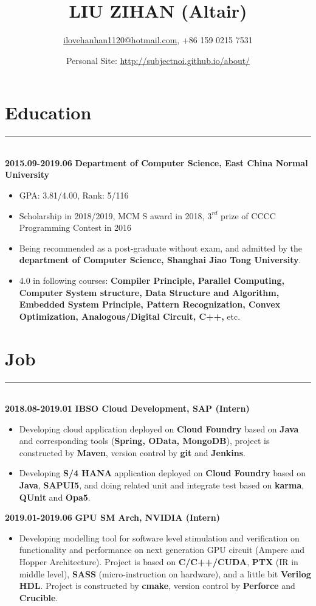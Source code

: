 \documentclass[a4paper]{article}
\title{LIU ZIHAN (Altair)}
\author{\url{ilovehanhan1120@hotmail.com}, +86 159 0215 7531}
\date{Personal Site: \url{http://subjectnoi.github.io/about/}}
\begin{document}
		\maketitle
		\section*{Education}
		\rule[1pt]{19cm}{0.01em}\\
		\textbf{2015.09-2019.06} \hfill \textbf{Department of Computer Science, East China Normal University}
		\begin{itemize}
		\item GPA: 3.81/4.00, Rank: 5/116
		\item Scholarship in 2018/2019, MCM S award in 2018, $ 3^{rd} $ prize of CCCC Programming Contest in 2016
		\item Being recommended as a post-graduate without exam, and admitted by the \textbf{department of Computer Science, Shanghai Jiao Tong University}.
		\item 4.0 in following courses: \textbf{Compiler Principle, Parallel Computing, Computer System structure, Data Structure and Algorithm, Embedded System Principle, Pattern Recognization, Convex Optimization, Analogous/Digital Circuit, C++,} etc.
		\end{itemize}
		\section*{Job}
		\rule[1pt]{19cm}{0.01em}\\
		\textbf{2018.08-2019.01} \hfill \textbf{IBSO Cloud Development, SAP (Intern)}\\
		\begin{itemize}
		\item Developing cloud application deployed on \textbf{Cloud Foundry} based on \textbf{Java} and corresponding tools (\textbf{Spring, OData, MongoDB}), project is constructed by \textbf{Maven}, version control by \textbf{git} and \textbf{Jenkins}.
		\item Developing \textbf{S/4 HANA} application deployed on \textbf{Cloud Foundry} based on \textbf{Java}, \textbf{SAPUI5}, and doing related unit and integrate test based on \textbf{karma}, \textbf{QUnit} and \textbf{Opa5}.
		\end{itemize}
		\textbf{2019.01-2019.06} \hfill \textbf{GPU SM Arch, NVIDIA (Intern)}
		\begin{itemize}
		\item Developing modelling tool for software level stimulation and verification on functionality and performance on next generation GPU circuit (Ampere and Hopper Architecture). Project is based on \textbf{C/C++/CUDA}, \textbf{PTX} (IR in middle level), \textbf{SASS} (micro-instruction on hardware), and a little bit \textbf{Verilog HDL}. Project is constructed by \textbf{cmake}, version control by \textbf{Perforce} and \textbf{Crucible}.
		\end{itemize}
\end{document}
